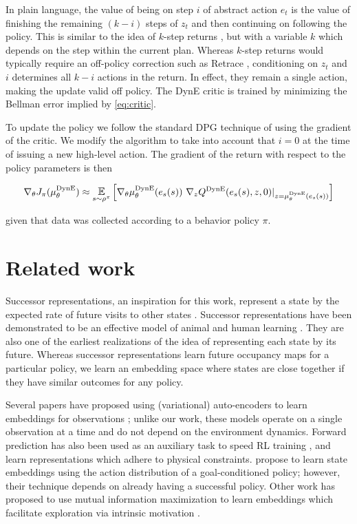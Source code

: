 In plain language, the value of being on step $i$ of abstract action $e_t$ is the value of finishing the remaining $(k-i)$ steps of $z_t$ and then continuing on following the policy.
This is similar to the idea of $k$-step returns \citep{sutton2018reinforcement}, but with a variable $k$ which depends on the step within the current plan.
Whereas $k$-step returns would typically require an off-policy correction such as Retrace \citep{munos2016safe}, conditioning on $z_t$ and $i$ determines all $k-i$ actions in the return.
In effect, they remain a single action, making the update valid off policy.
The DynE critic is trained by minimizing the Bellman error implied by \cref{eq:critic}.

To update the policy we follow the standard DPG technique of using the gradient of the critic.
We modify the algorithm to take into account that $i=0$ at the time of issuing a new high-level action.
The gradient of the return with respect to the policy parameters is then

\begin{align}
\nabla_\theta J_\pi(\mu^{\text{DynE}}_\theta) \approx \E_{s \sim \rho^\pi} \Big[ \nabla_\theta \mu^{\text{DynE}}_\theta(e_s(s)) ~ \nabla_z Q^{\text{DynE}}(e_s(s), z, 0)|_{z=\mu^{\text{DynE}}_\theta(e_s(s))} \Big]
\end{align}

given that data was collected according to a behavior policy $\pi$.


\section{Related work}
Successor representations, an inspiration for this work, represent a state by the expected rate of future visits to other states \citep{dayan1993improving,kulkarni2016deep,barreto2017successor}.
Successor representations have been demonstrated to be an effective model of animal and human learning \citep{momennejad2017successor,stachenfeld2017hippocampus}.
They are also one of the earliest realizations of the idea of representing each state by its future.
Whereas successor representations learn future occupancy maps for a particular policy, we learn an embedding space where states are close together if they have similar outcomes for any policy.

Several papers have proposed using (variational) auto-encoders to learn embeddings for observations \citep{lange2010deep,van2016stable,higgins2017darla,caselles2018continual}; unlike our work, these models operate on a single observation at a time and do not depend on the environment dynamics.
Forward prediction has also been used as an auxiliary task to speed RL training \citep{jaderberg2016reinforcement}, and \citet{Jonschkowski2017PVEsPE} learn representations which adhere to physical constraints.
\citet{ghosh2018learning} propose to learn state embeddings using the action distribution of a goal-conditioned policy; however, their technique depends on already having a successful policy.
Other work has proposed to use mutual information maximization to learn embeddings which facilitate exploration via intrinsic motivation \citep{kim2018emi}.

